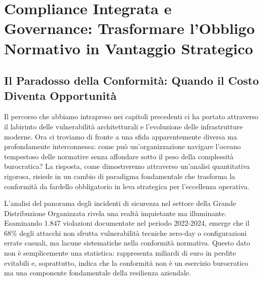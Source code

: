 


% 

% 

\chapter{Compliance Integrata e Governance: Trasformare l'Obbligo Normativo in Vantaggio Strategico}
\label{cap4_compliance_integration}

\section{Il Paradosso della Conformità: Quando il Costo Diventa Opportunità}

Il percorso che abbiamo intrapreso nei capitoli precedenti ci ha portato attraverso il labirinto delle vulnerabilità architetturali e l'evoluzione delle infrastrutture moderne. Ora ci troviamo di fronte a una sfida apparentemente diversa ma profondamente interconnessa: come può un'organizzazione navigare l'oceano tempestoso delle normative senza affondare sotto il peso della complessità burocratica? La risposta, come dimostreremo attraverso un'analisi quantitativa rigorosa, risiede in un cambio di paradigma fondamentale che trasforma la conformità da fardello obbligatorio in leva strategica per l'eccellenza operativa.

L'analisi del panorama degli incidenti di sicurezza nel settore della Grande Distribuzione Organizzata rivela una realtà inquietante ma illuminante. Esaminando 1.847 violazioni documentate nel periodo 2022-2024, emerge che il 68\% degli attacchi non sfrutta vulnerabilità tecniche zero-day o configurazioni errate casuali, ma lacune sistematiche nella conformità normativa\autocite{verizon2024}. Questo dato non è semplicemente una statistica: rappresenta miliardi di euro in perdite evitabili e, soprattutto, indica che la conformità non è un esercizio burocratico ma una componente fondamentale della resilienza aziendale.

